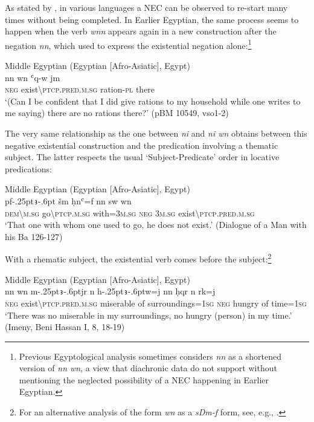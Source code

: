 \documentclass[output=paper]{langsci/langscibook}
\newcommand{\ꜥ}{ʿ}
\newcommand{\ꜣ}{\kern-.25pt\texttt{ꜣ}\kern-.6pt}
\begin{document}
As stated by \citet[174]{Veselinova2016}, in various languages a NEC can be observed to re-start many times without being completed. In Earlier Egyptian, the same process seems to happen when the verb \textit{wnn} appears again in a new construction after the negation \textit{nn}, which used to express the existential negation alone:\footnote{Previous Egyptological analysis sometimes considers \textit{nn} as a shortened version of \textit{nn wn}, a view that diachronic data do not support without mentioning the neglected possibility of a NEC happening in Earlier Egyptian. }  
 
\ea Middle Egyptian (Egyptian [Afro-Asiatic], Egypt) \label{ex:AE37}\\
    \gll nn wn {\ꜥ}q-w jm  \\
    \textsc{neg} exist\textbackslash\textsc{ptcp.pred.m.sg} ration-\textsc{pl} there\\ 
    \glt ‘(Can I be confident that I did give rations to my household while one writes to me saying) there are no rations there?’ (pBM 10549, vso1-2) 
\z 
 
The very same relationship as the one between \textit{ni} and \textit{ni wn} obtains between this negative existential construction and the predication involving a thematic subject. The latter respects the usual ‘Subject-Predicate’ order in locative predications: 

\ea Middle Egyptian (Egyptian [Afro-Asiatic], Egypt) \label{ex:AE38}\\
    \gll pf{\ꜣ} šm ḥn{\ꜥ}=f nn sw wn\\
    \textsc{dem\textbackslash m.sg} go\textbackslash\textsc{ptcp.m.sg} with=\textsc{3m.sg} \textsc{neg} \textsc{3m.sg} exist\textbackslash\textsc{ptcp.pred.m.sg}\\ 
    \glt ‘That one with whom one used to go, he does not exist.’ (Dialogue of a Man with his Ba 126-127) 
\z 
 
 With a rhematic subject, the existential verb comes before the subject:\footnote{For an alternative analysis of the form \textit{wn} as a \textit{sDm-f} form, see, e.g., \citet{Uljas2013}.}
 
\ea Middle Egyptian (Egyptian [Afro-Asiatic], Egypt) \label{ex:AE39}\\
    \gll nn wn m{\ꜣ}jr n h{\ꜣ}w=j nn ḥqr n rk=j\\
    \textsc{neg} exist\textbackslash\textsc{ptcp.pred.m.sg} miserable of surroundings=\textsc{1sg} \textsc{neg} hungry of time=\textsc{1sg}\\ 
    \glt ‘There was no miserable in my surroundings, no hungry (person) in my time.’ (Imeny, Beni Hassan I, 8, 18-19) 
\z
\end{document}

